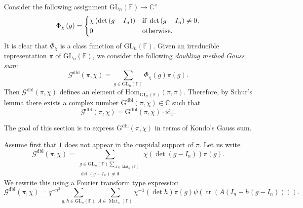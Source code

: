 \documentclass[12pt, reqno]{amsart}
\theoremstyle{definition}
\theoremstyle{definition}
\theoremstyle{definition}
\newcommand{\cComplex}{\mathbb{C}}
\newcommand{\multiplicativegroup}[1]{#1^{\times}}
\newcommand{\Hom}{\mathrm{Hom}}
\newcommand{\idmap}{\mathrm{id}}
\newcommand{\fieldCharacter}{\psi}
\newcommand{\IdentityMatrix}[1]{I_{#1}}
\newcommand{\trace}{\operatorname{tr}}
\newcommand{\GL}{\mathrm{GL}}
\newcommand{\finiteField}{\mathbb{F}}
\newcommand{\squareMatrix}{\operatorname{Mat}}
\newcommand{\dblGaussSum}[2]{\mathcal{G}^{\mathrm{dbl}}\left(#1, #2\right)}
\newcommand{\dblGaussSumScalar}[2]{\mathrm{G}^{\mathrm{dbl}}\left(#1, #2\right)}
\begin{document}
Consider the following assignment $\GL_n\left(\finiteField\right) \to \multiplicativegroup{\cComplex}$
$$\Phi_{\chi}\left(g\right) = \begin{dcases}
	\chi\left(\det\left(g-\IdentityMatrix{n}\right)\right) & \text{if }\det\left(g-\IdentityMatrix{n}\right) \ne 0,\\
	0 & \text{otherwise.}
\end{dcases}$$
It is clear that $\Phi_{\chi}$ is a class function of $\GL_n\left(\finiteField\right)$. Given an irreducible representation $\pi$ of $\GL_n\left(\finiteField\right)$, we consider the following \emph{doubling method Gauss sum}:
$$\dblGaussSum{\pi}{\chi} = \sum_{g \in \GL_n\left(\finiteField\right)} \Phi_{\chi}\left(g\right) \pi\left(g\right).$$
Then $\dblGaussSum{\pi}{\chi}$ defines an element of $\Hom_{\GL_n\left(\finiteField\right)}\left(\pi, \pi\right)$. Therefore, by Schur's lemma there exists a complex number $\dblGaussSumScalar{\pi}{\chi} \in \cComplex$ such that $$\dblGaussSum{\pi}{\chi} = \dblGaussSumScalar{\pi}{\chi} \cdot \idmap_\pi.$$ 

The goal of this section is to express $\dblGaussSumScalar{\pi}{\chi}$ in terms of Kondo's Gauss sum.

Assume first that $1$ does not appear in the cuspidal support of $\pi$. Let us write
$$\dblGaussSum{\pi}{\chi} = \sum_{\substack{g \in \GL_n\left(\finiteField\right) \sum_{A \in \squareMatrix_n\left(\finiteField\right)}\\
\det\left(g - \IdentityMatrix{n}\right) \ne 0}} \chi\left(\det\left(g - \IdentityMatrix{n}\right)\right) \pi\left(g\right).$$
We rewrite this using a Fourier transform type expression
$$\dblGaussSum{\pi}{\chi} = q^{-n^2} \sum_{g, h \in \GL_n\left(\finiteField\right)} \sum_{A \in \squareMatrix_n\left(\finiteField\right)} \chi^{-1}\left(\det h\right) \pi\left(g\right) \fieldCharacter\left(\trace\left(A \left(\IdentityMatrix{n} - h \left(g - \IdentityMatrix{n}\right)\right)\right)\right).$$
\end{document}
